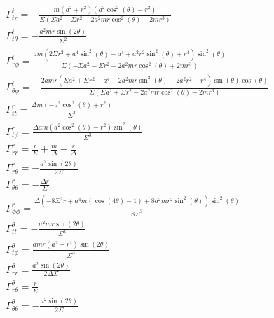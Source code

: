\documentclass[10pt,a4paper]{report}
\begin{document}
\small\begin{align*}
\Gamma^t_{tr} = - \frac{m \left(a^{2} + r^{2}\right) \left(a^{2} \cos^{2}{\left(\theta \right)} - r^{2}\right)}{\Sigma \left(\Sigma a^{2} + \Sigma r^{2} - 2 a^{2} m r \cos^{2}{\left(\theta \right)} - 2 m r^{3}\right)}\\
\Gamma^t_{t\theta} = - \frac{a^{2} m r \sin{\left(2 \theta \right)}}{\Sigma^{2}}\\
\Gamma^t_{r\phi} = \frac{a m \left(2 \Sigma r^{2} + a^{4} \sin^{2}{\left(\theta \right)} - a^{4} + a^{2} r^{2} \sin^{2}{\left(\theta \right)} + r^{4}\right) \sin^{2}{\left(\theta \right)}}{\Sigma \left(- \Sigma a^{2} - \Sigma r^{2} + 2 a^{2} m r \cos^{2}{\left(\theta \right)} + 2 m r^{3}\right)}\\
\Gamma^t_{\theta\phi} = - \frac{2 a m r \left(\Sigma a^{2} + \Sigma r^{2} - a^{4} + 2 a^{2} m r \sin^{2}{\left(\theta \right)} - 2 a^{2} r^{2} - r^{4}\right) \sin{\left(\theta \right)} \cos{\left(\theta \right)}}{\Sigma \left(\Sigma a^{2} + \Sigma r^{2} - 2 a^{2} m r \cos^{2}{\left(\theta \right)} - 2 m r^{3}\right)}\\
\Gamma^r_{tt} = \frac{\Delta m \left(- a^{2} \cos^{2}{\left(\theta \right)} + r^{2}\right)}{\Sigma^{3}}\\
\Gamma^r_{t\phi} = \frac{\Delta a m \left(a^{2} \cos^{2}{\left(\theta \right)} - r^{2}\right) \sin^{2}{\left(\theta \right)}}{\Sigma^{3}}\\
\Gamma^r_{rr} = \frac{r}{\Sigma} + \frac{m}{\Delta} - \frac{r}{\Delta}\\
\Gamma^r_{r\theta} = - \frac{a^{2} \sin{\left(2 \theta \right)}}{2 \Sigma}\\
\Gamma^r_{\theta\theta} = - \frac{\Delta r}{\Sigma}\\
\Gamma^r_{\phi\phi} = \frac{\Delta \left(- 8 \Sigma^{2} r + a^{4} m \left(\cos{\left(4 \theta \right)} - 1\right) + 8 a^{2} m r^{2} \sin^{2}{\left(\theta \right)}\right) \sin^{2}{\left(\theta \right)}}{8 \Sigma^{3}}\\
\Gamma^\theta_{tt} = - \frac{a^{2} m r \sin{\left(2 \theta \right)}}{\Sigma^{3}}\\
\Gamma^\theta_{t\phi} = \frac{a m r \left(a^{2} + r^{2}\right) \sin{\left(2 \theta \right)}}{\Sigma^{3}}\\
\Gamma^\theta_{rr} = \frac{a^{2} \sin{\left(2 \theta \right)}}{2 \Delta \Sigma}\\
\Gamma^\theta_{r\theta} = \frac{r}{\Sigma}\\
\Gamma^\theta_{\theta\theta} = - \frac{a^{2} \sin{\left(2 \theta \right)}}{2 \Sigma}\\

\end{align*}
\end{document}
